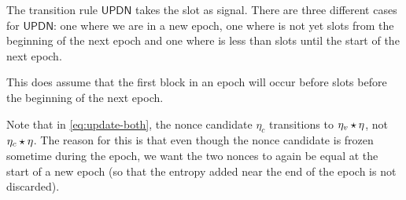 The transition rule $\mathsf{UPDN}$ takes the slot  as signal. There are
three different cases for $\mathsf{UPDN}$: one where we are in a new epoch, one
where  is not yet \SlotsPrior{} slots from the beginning of the next
epoch and one where  is less than \SlotsPrior{} slots until the start of
the next epoch.

This does assume that the first block in an epoch will occur before
\SlotsPrior{} slots before the beginning of the next epoch.

Note that in \ref{eq:update-both}, the nonce candidate $\eta_c$ transitions to
$\eta_v\star\eta$, not $\eta_c\star\eta$. The reason for this is that even
though the nonce candidate is frozen sometime during the epoch, we want the two
nonces to again be equal at the start of a new epoch (so that the entropy added
near the end of the epoch is not discarded).

